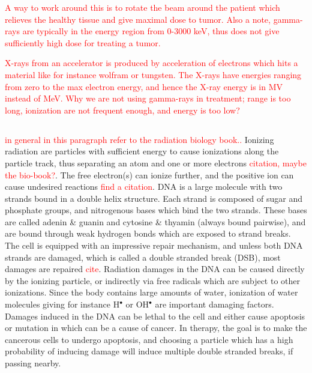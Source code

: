 \textcolor{red}{
A way to work around this is to rotate the beam around the patient which relieves the healthy tissue and give maximal dose to tumor. Also a note, gamma-rays are typically in the energy region from 0-3000 keV, thus does not give sufficiently high dose for treating a tumor. 

X-rays from an accelerator is produced by acceleration of electrons which hits a material like for instance wolfram or tungsten. The X-rays have energies ranging from zero to the max electron energy, and hence the X-ray energy is in MV instead of MeV. 
Why we are not using gamma-rays in treatment; range is too long, ionization are not frequent enough, and energy is too low?}


\subsection*{}
\textcolor{red}{in general in this paragraph refer to the radiation biology book.. }
Ionizing radiation are particles with sufficient energy to cause ionizations along the particle track, thus separating an atom and one or more electrons \textcolor{red}{citation, maybe the bio-book?}. The free electron(s) can ionize further, and the positive ion can cause undesired reactions \textcolor{red}{find a citation}. DNA is a large molecule with two strands bound in a double helix structure. Each strand is composed of sugar and phosphate groups, and nitrogenous bases which bind the two strands. These bases are called adenin \& guanin and cytosine \& thyamin (always bound pairwise), and are bound through weak hydrogen bonds which are exposed to strand breaks. The cell is equipped with an impressive repair mechanism, and  unless both DNA strands are damaged, which is called a double stranded break (DSB), most damages are repaired \textcolor{red}{cite}. Radiation damages in the DNA can be caused directly by the ionizing particle, or indirectly via free radicals which are subject to other ionizations.  Since the body contains large amounts of water, ionization of water molecules giving for instance H$^\bullet$ or OH$^\bullet$ are important damaging factors. Damages induced in the DNA can be lethal to the cell and either cause apoptosis or mutation in which can be a cause of cancer. In therapy, the goal is to make the cancerous cells to undergo apoptosis, and choosing a particle which has a high probability of inducing damage will induce multiple double stranded breaks, if passing nearby. \\

